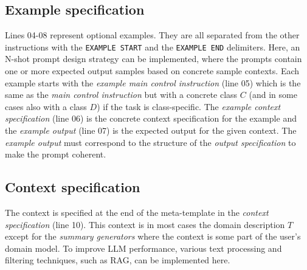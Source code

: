 \subsection{Example specification}

Lines 04-08 represent optional examples. They are all separated from the other instructions with the \texttt{EXAMPLE START} and the \texttt{EXAMPLE END} delimiters. Here, an N-shot prompt design strategy can be implemented, where the prompts contain one or more expected output samples based on concrete sample contexts. Each example starts with the \emph{example main control instruction} (line 05) which is the same as the \emph{main control instruction} but with a concrete class $C$ (and in some cases also with a class $D$) if the task is class-specific. The \emph{example context specification} (line 06) is the concrete context specification for the example and the \emph{example output} (line 07) is the expected output for the given context. The \emph{example output} must correspond to the structure of the \emph{output specification} to make the prompt coherent.


\subsection{Context specification}

The context is specified at the end of the meta-template in the \emph{context specification} (line 10). This context is in most cases the domain description $T$ except for the \emph{summary generators} where the context is some part of the user's domain model. To improve LLM performance, various text processing and filtering techniques, such as RAG, can be implemented here.